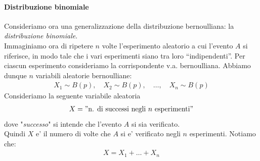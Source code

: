 \documentclass[a4paper,12pt]{article}
\begin{document}
\paragraph{Distribuzione binomiale} Consideriamo ora una generalizzazione della distribuzione bernoulliana: la \textit{distribuzione binomiale}. \\
Immaginiamo ora di ripetere $n$ volte l'esperimento aleatorio a cui l'evento $A$ si riferisce, in modo tale che i vari esperimenti siano tra loro “indipendenti”. Per ciascun esperimento consideriamo la corrispondente v.a. bernoulliana. Abbiamo dunque $n$ variabili aleatorie bernoulliane:
\begin{align*}
  X_1 \sim B(p), \quad X_2 \sim B(p), \quad \dots, \quad X_n \sim B(p)
\end{align*}
Consideriamo la seguente variabile aleatoria
\begin{align*}
  X = "\text{n. di successi negli $n$ esperimenti}"
\end{align*}
dove "\textit{successo}" si intende che l'evento $A$ si sia verificato.\\
Quindi $X$ e' il numero di volte che $A$ si e' verificato negli $n$ esperimenti. Notiamo che:
\begin{align*}
  X = X_1 + \dots + X_n
\end{align*}
\vspace{5px}\\
\\
\vspace{5px}\\
\end{document}

